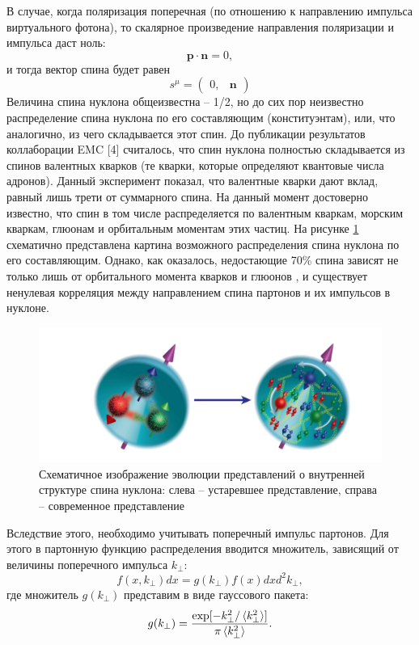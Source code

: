 \documentclass{extarticle}
\begin{document}
В случае, когда поляризация поперечная (по отношению к направлению импульса виртуального фотона), то скалярное произведение направления поляризации и импульса даст ноль:
\begin{equation}
	\boldsymbol{p} \cdot \boldsymbol{n} = 0,
\end{equation}
и тогда вектор спина будет равен
\begin{equation}
	s^\mu = \begin{pmatrix}
		0, & \boldsymbol{n}
	\end{pmatrix}
\end{equation}
 Величина спина нуклона общеизвестна – 1/2, но до сих пор неизвестно распределение спина нуклона по его составляющим (конституэнтам), или, что аналогично, из чего складывается этот спин. До публикации результатов коллаборации EMC [4] считалось, что спин нуклона полностью складывается из спинов валентных кварков (те кварки, которые определяют квантовые числа адронов). Данный эксперимент показал, что валентные кварки дают вклад, равный лишь трети от суммарного спина. На данный момент достоверно известно, что спин в том числе распределяется по валентным кваркам, морским кваркам, глюонам и орбитальным моментам этих частиц. На рисунке \ref{fig:nucleo} схематично представлена картина возможного распределения спина нуклона по его составляющим.
 Однако, как оказалось, недостающие 70\% спина зависят не только лишь от орбитального момента кварков и глюонов \cite{Hagler}, и существует ненулевая корреляция между направлением спина партонов и их импульсов в нуклоне. 

\begin{figure}[ht]
    \centering
    \includegraphics[width = 0.9\linewidth]{nucleo.png}
    \caption{Схематичное изображение эволюции представлений о внутренней структуре спина нуклона: слева – устаревшее представление, справа – современное представление}
    \label{fig:nucleo}
\end{figure}
 
 Вследствие этого, необходимо учитывать поперечный импульс партонов. Для этого в партонную функцию распределения вводится множитель, зависящий от величины поперечного импульса $k_{\perp}$:
 \begin{equation}
 	f(x, k_{\perp})dx =g(k_{\perp}) f(x) dx d^2k_{\perp},
 \end{equation}
 где множитель $g(k_{\perp})$ представим в виде гауссового пакета:
 \begin{equation}
 	g(k_{\perp}) = \frac{\exp [-k^2_{\perp} / \braket{k^2_\perp}]}{\pi \braket{k^2_\perp}}.
 \end{equation}
\end{document}
